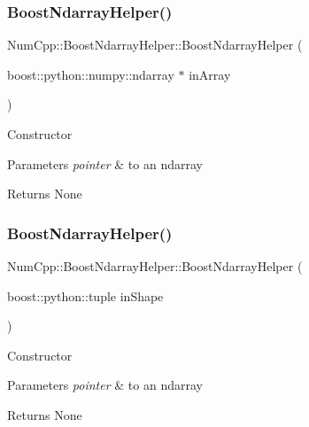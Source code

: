 \subsubsection{\texorpdfstring{Boost\+Ndarray\+Helper()}{BoostNdarrayHelper()}\hspace{0.1cm}{\footnotesize\ttfamily [1/2]}}
{\footnotesize\ttfamily Num\+Cpp\+::\+Boost\+Ndarray\+Helper\+::\+Boost\+Ndarray\+Helper (\begin{DoxyParamCaption}\item[{boost\+::python\+::numpy\+::ndarray $\ast$}]{in\+Array }\end{DoxyParamCaption})\hspace{0.3cm}{\ttfamily [inline]}}

Constructor


\begin{DoxyParams}{Parameters}
{\em pointer} & to an ndarray\\
\hline
\end{DoxyParams}
\begin{DoxyReturn}{Returns}
None 
\end{DoxyReturn}
\mbox{\label{class_num_cpp_1_1_boost_ndarray_helper_acd629d37df30bd06c40165648a7ddffd}} 
\subsubsection{\texorpdfstring{Boost\+Ndarray\+Helper()}{BoostNdarrayHelper()}\hspace{0.1cm}{\footnotesize\ttfamily [2/2]}}
{\footnotesize\ttfamily Num\+Cpp\+::\+Boost\+Ndarray\+Helper\+::\+Boost\+Ndarray\+Helper (\begin{DoxyParamCaption}\item[{boost\+::python\+::tuple}]{in\+Shape }\end{DoxyParamCaption})\hspace{0.3cm}{\ttfamily [inline]}}

Constructor


\begin{DoxyParams}{Parameters}
{\em pointer} & to an ndarray\\
\hline
\end{DoxyParams}
\begin{DoxyReturn}{Returns}
None 
\end{DoxyReturn}


